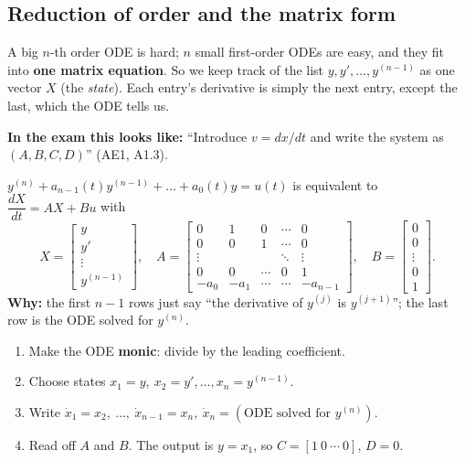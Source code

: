 \subsection{Reduction of order and the matrix form \texorpdfstring{}{}}\label{sec:reduction}\label{ss:1-4}
\begin{plainbox}
A big $n$-th order ODE is hard; $n$ small first-order ODEs are easy, and they fit into \textbf{one matrix equation}.
So we keep track of the list $y, y', \dots, y^{(n-1)}$ as one vector $X$ (the \emph{state}).
Each entry's derivative is simply the next entry, except the last, which the ODE tells us.
\par\smallskip\textbf{In the exam this looks like:} ``Introduce $v=dx/dt$ and write the system as $(A,B,C,D)$'' (AE1, A1.3).
\end{plainbox}
\begin{thmbox}[title={Lemma 0.2 (reduction of order) \fr{26--27}}]
$y^{(n)}+a_{n-1}(t)y^{(n-1)}+\dots+a_0(t)y=u(t)$ is equivalent to $\dfrac{dX}{dt}=AX+Bu$ with
\[
X=\begin{bmatrix}y\\y'\\\vdots\\y^{(n-1)}\end{bmatrix},\quad
A=\begin{bmatrix}0&1&0&\cdots&0\\0&0&1&\cdots&0\\\vdots&&&\ddots&\vdots\\0&0&\cdots&0&1\\-a_0&-a_1&\cdots&\cdots&-a_{n-1}\end{bmatrix},\quad
B=\begin{bmatrix}0\\0\\\vdots\\0\\1\end{bmatrix}.
\]
\textbf{Why:} the first $n-1$ rows just say ``the derivative of $y^{(j)}$ is $y^{(j+1)}$''; the last row is the ODE solved for $y^{(n)}$.
\end{thmbox}

\begin{methodbox}[title={Method: write an ODE as $(A,B,C,D)$}]
\begin{enumerate}
\item Make the ODE \textbf{monic}: divide by the leading coefficient.
\item Choose states $x_1=y,\ x_2=y',\dots,x_n=y^{(n-1)}$.
\item Write $\dot x_1=x_2,\ \dots,\ \dot x_{n-1}=x_n,\ \dot x_n=(\text{ODE solved for }y^{(n)})$.
\item Read off $A$ and $B$. The output is $y=x_1$, so $C=[1\ 0\ \cdots\ 0]$, $D=0$.
\end{enumerate}
\end{methodbox}

